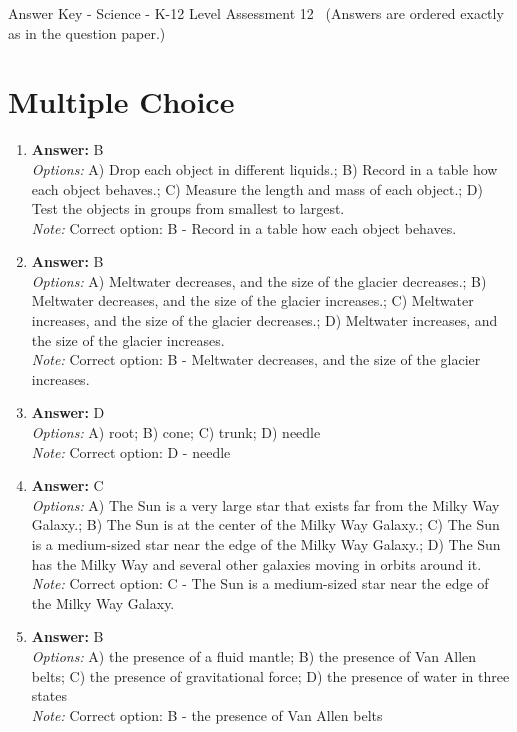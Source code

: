 \documentclass[12pt]{article}
\begin{document}
\begin{center}
Answer Key - Science - K-12 Level Assessment 12 \
\small (Answers are ordered exactly as in the question paper.)
\end{center}

\section*{Multiple Choice}
\begin{enumerate}[label=\arabic*.]
\item \textbf{Answer:} B
\\ \textit{Options:} A) Drop each object in different liquids.; B) Record in a table how each object behaves.; C) Measure the length and mass of each object.; D) Test the objects in groups from smallest to largest.
\\ \textit{Note:} Correct option: B - Record in a table how each object behaves.
\item \textbf{Answer:} B
\\ \textit{Options:} A) Meltwater decreases, and the size of the glacier decreases.; B) Meltwater decreases, and the size of the glacier increases.; C) Meltwater increases, and the size of the glacier decreases.; D) Meltwater increases, and the size of the glacier increases.
\\ \textit{Note:} Correct option: B - Meltwater decreases, and the size of the glacier increases.
\item \textbf{Answer:} D
\\ \textit{Options:} A) root; B) cone; C) trunk; D) needle
\\ \textit{Note:} Correct option: D - needle
\item \textbf{Answer:} C
\\ \textit{Options:} A) The Sun is a very large star that exists far from the Milky Way Galaxy.; B) The Sun is at the center of the Milky Way Galaxy.; C) The Sun is a medium-sized star near the edge of the Milky Way Galaxy.; D) The Sun has the Milky Way and several other galaxies moving in orbits around it.
\\ \textit{Note:} Correct option: C - The Sun is a medium-sized star near the edge of the Milky Way Galaxy.
\item \textbf{Answer:} B
\\ \textit{Options:} A) the presence of a fluid mantle; B) the presence of Van Allen belts; C) the presence of gravitational force; D) the presence of water in three states
\\ \textit{Note:} Correct option: B - the presence of Van Allen belts
\end{enumerate}
\end{document}
